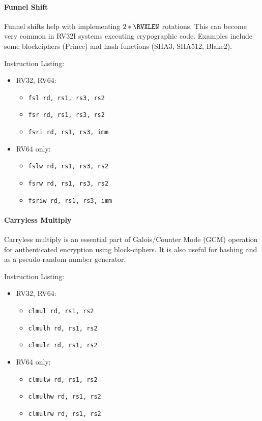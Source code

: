 \paragraph{Funnel Shift}
Funnel shifts help with implementing $2*\RVXLEN$ rotations.
This can become very common in RV32I systems executing crypographic code.
Examples include some blockciphers (Prince) and
hash functions (SHA3, SHA512, Blake2).

Instruction Listing:
\begin{itemize}
\item RV32, RV64:
\begin{itemize}
\item {\tt fsl  rd, rs1, rs3, rs2}
\item {\tt fsr  rd, rs1, rs3, rs2}
\item {\tt fsri rd, rs1, rs3, imm}
\end{itemize}
\item RV64 only:
\begin{itemize}
\item {\tt fslw  rd, rs1, rs3, rs2}
\item {\tt fsrw  rd, rs1, rs3, rs2}
\item {\tt fsriw rd, rs1, rs3, imm}
\end{itemize}
\end{itemize}


\paragraph{Carryless Multiply}
Carryless multiply is an essential part of Galois/Counter Mode (GCM)
operation for authenticated encryption using block-ciphers.
It is also useful for hashing and as a pseudo-random number generator.

Instruction Listing:
\begin{itemize}
\item RV32, RV64:
\begin{itemize}
\item {\tt clmul  rd, rs1, rs2}
\item {\tt clmulh rd, rs1, rs2}
\item {\tt clmulr rd, rs1, rs2}
\end{itemize}
\item RV64 only:
\begin{itemize}
\item {\tt clmulw  rd, rs1, rs2}
\item {\tt clmulhw rd, rs1, rs2}
\item {\tt clmulrw rd, rs1, rs2}
\end{itemize}
\end{itemize}

